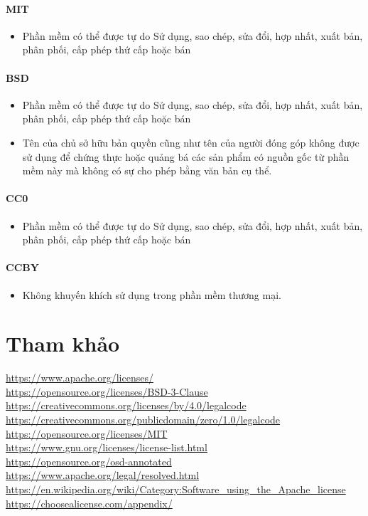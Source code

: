 \documentclass[12pt]{article}
\begin{document}
\paragraph{MIT}
\begin{itemize}
\item Phần mềm có thể được tự do Sử dụng, sao chép, sửa đổi, hợp nhất, xuất bản, phân phối, cấp phép thứ cấp hoặc bán
\end{itemize}
\paragraph{BSD}
\begin{itemize}
\item Phần mềm có thể được tự do Sử dụng, sao chép, sửa đổi, hợp nhất, xuất bản, phân phối, cấp phép thứ cấp hoặc bán
\item Tên của chủ sở hữu bản quyền cũng như tên của người đóng góp không được sử dụng để chứng thực hoặc quảng bá các sản phẩm có nguồn gốc từ phần mềm này mà không có sự cho phép bằng văn bản cụ thể.
\end{itemize}

\paragraph{CC0}
\begin{itemize}
\item Phần mềm có thể được tự do Sử dụng, sao chép, sửa đổi, hợp nhất, xuất bản, phân phối, cấp phép thứ cấp hoặc bán 
\end{itemize}
\paragraph{CCBY}
\begin{itemize}
\item Không khuyến khích sử dụng trong phần mềm thương mại.
\end{itemize}

\section{Tham khảo}
\url{https://www.apache.org/licenses/} \\
\url{https://opensource.org/licenses/BSD-3-Clause}\\
\url{https://creativecommons.org/licenses/by/4.0/legalcode}\\
\url{https://creativecommons.org/publicdomain/zero/1.0/legalcode}\\
\url{https://opensource.org/licenses/MIT}\\
\url{https://www.gnu.org/licenses/license-list.html}\\
\url{https://opensource.org/osd-annotated}\\
\url{https://www.apache.org/legal/resolved.html}\\
\url{https://en.wikipedia.org/wiki/Category:Software_using_the_Apache_license}\\
\url{https://choosealicense.com/appendix/}\\
\end{document}

